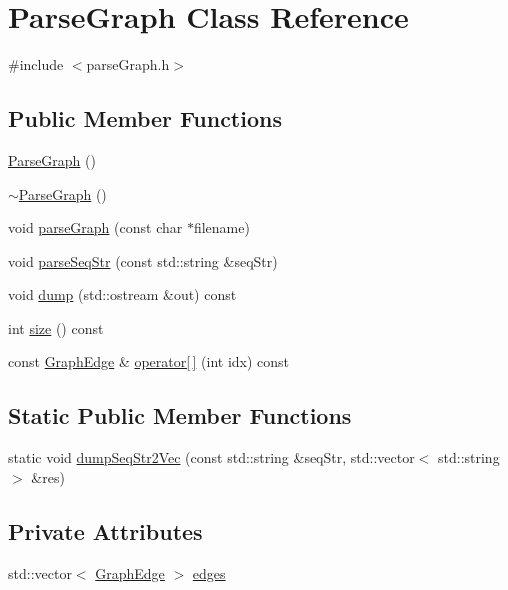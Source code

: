 \hypertarget{class_parse_graph}{\section{Parse\+Graph Class Reference}
\label{class_parse_graph}
}


{\ttfamily \#include $<$parse\+Graph.\+h$>$}

\subsection*{Public Member Functions}
\begin{DoxyCompactItemize}
\item 
\hyperlink{class_parse_graph_ac028f7a94597ca2ac3b01e10ba266935}{Parse\+Graph} ()
\item 
\hyperlink{class_parse_graph_a6becedb93dd1914f77a4aea19a0b8d28}{$\sim$\+Parse\+Graph} ()
\item 
void \hyperlink{class_parse_graph_a2ace10c27cbb5a41b5a027d61c5cdfd2}{parse\+Graph} (const char $\ast$filename)
\item 
void \hyperlink{class_parse_graph_a0c66bf675ab6613f0124695e8ff9a70d}{parse\+Seq\+Str} (const std\+::string \&seq\+Str)
\item 
void \hyperlink{class_parse_graph_a4aefd95b81fbfcb690569ef10c5860ff}{dump} (std\+::ostream \&out) const 
\item 
int \hyperlink{class_parse_graph_a6fe380fb738f8e98d9cb9c8a1277b13f}{size} () const 
\item 
const \hyperlink{struct_graph_edge}{Graph\+Edge} \& \hyperlink{class_parse_graph_adeac9d18aed9c028ded376dc55940da8}{operator\mbox{[}$\,$\mbox{]}} (int idx) const 
\end{DoxyCompactItemize}
\subsection*{Static Public Member Functions}
\begin{DoxyCompactItemize}
\item 
static void \hyperlink{class_parse_graph_ad5cc3b524addc21852012302eecee7ad}{dump\+Seq\+Str2\+Vec} (const std\+::string \&seq\+Str, std\+::vector$<$ std\+::string $>$ \&res)
\end{DoxyCompactItemize}
\subsection*{Private Attributes}
\begin{DoxyCompactItemize}
\item 
std\+::vector$<$ \hyperlink{struct_graph_edge}{Graph\+Edge} $>$ \hyperlink{class_parse_graph_a65a7410819c36f48c0c5ebf787f57afb}{edges}
\end{DoxyCompactItemize}



